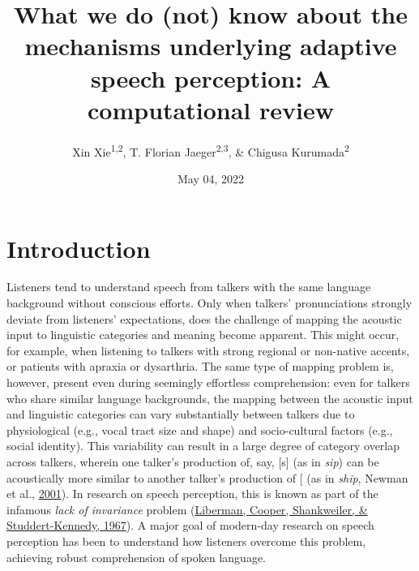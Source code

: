 \documentclass[
  11pt,
  english,
  man,floatsintext]{apa6}
\title{What we do (not) know about the mechanisms underlying adaptive speech perception: A computational review}
\author{Xin Xie\textsuperscript{1,2}, T. Florian Jaeger\textsuperscript{2,3}, \& Chigusa Kurumada\textsuperscript{2}}
\date{May 04, 2022}
\affiliation{\vspace{0.5cm}\textsuperscript{1} Language Science, University of California, Irvine\\\textsuperscript{2} Brain and Cognitive Sciences, University of Rochester\\\textsuperscript{3} Computer Science, University of Rochester}
\begin{document}
\maketitle

\hypertarget{introduction}{%
\section{Introduction}\label{introduction}}

Listeners tend to understand speech from talkers with the same language background without conscious efforts. Only when talkers' pronunciations strongly deviate from listeners' expectations, does the challenge of mapping the acoustic input to linguistic categories and meaning become apparent. This might occur, for example, when listening to talkers with strong regional or non-native accents, or patients with apraxia or dysarthria. The same type of mapping problem is, however, present even during seemingly effortless comprehension: even for talkers who share similar language backgrounds, the mapping between the acoustic input and linguistic categories can vary substantially between talkers due to physiological (e.g., vocal tract size and shape) and socio-cultural factors (e.g., social identity). This variability can result in a large degree of category overlap across talkers, wherein one talker's production of, say, {[}s{]} (as in \emph{sip}) can be acoustically more similar to another talker's production of {[}\ipatext{ʃ}{]} (as in \emph{ship}, Newman et al., \protect\hyperlink{ref-newman2001}{2001}). In research on speech perception, this is known as part of the infamous \emph{lack of invariance} problem (\protect\hyperlink{ref-liberman1967}{Liberman, Cooper, Shankweiler, \& Studdert-Kennedy, 1967}). A major goal of modern-day research on speech perception has been to understand how listeners overcome this problem, achieving robust comprehension of spoken language.
\end{document}
